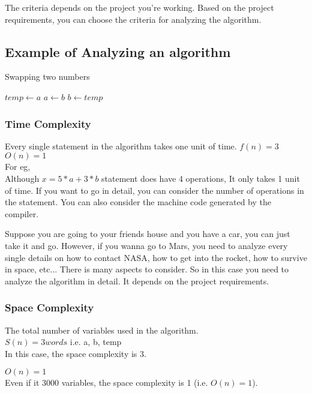 \documentclass[]{article}
\begin{document}
The criteria depends on the project you're working. Based on the project requirements, you can choose the criteria for analyzing the algorithm.

\subsection{Example of Analyzing an algorithm}
\noindent
\begin{algorithm}
\caption{Swapping two numbers}\label{analyze_swap}
\begin{algorithmic}
\State $temp \gets a$ 
\State $a \gets b$ 
\State $b \gets temp$ 
\EndProcedure
\end{algorithmic}
\end{algorithm}

\subsubsection{Time Complexity}
Every single statement in the algorithm takes one unit of time.
$f(n) = 3$ \\
$O(n) = 1$ \\
\break
\noindent
For eg, \\
Although $x = 5*a + 3*b$ statement does have 4 operations, It only takes 1 unit of time. 
If you want to go in detail, you can consider the number of operations in the statement. You can also consider the machine code generated by the compiler.

\noindent
Suppose you are going to your friends house and you have a car, you can just take it and go. However, if you wanna go to Mars, you need to analyze every single details on how to contact NASA, how to get into the rocket, how to survive in space, etc... There is many aspects to consider. So in this case you need to analyze the algorithm in detail. It depends on the project requirements.

\subsubsection{Space Complexity}
The total number of variables used in the algorithm. \\
$S(n) = 3 words$  i.e. a, b, temp\\ 
In this case, the space complexity is 3.

$O(n) = 1$ \\ 
Even if it 3000 variables, the space complexity is 1 (i.e. $O(n) = 1$).
\\
\end{document}
